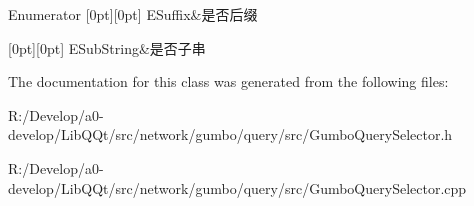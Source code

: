 \begin{DoxyEnumFields}{Enumerator}
[0pt][0pt]{}\mbox{\label{class_c_attribute_selector_ae0950894fd715af728d5a5c4621bf44da496c6a55d2ca0ea273def788f132b091}} 
E\+Suffix&是否后缀 \\
\hline

[0pt][0pt]{}\mbox{\label{class_c_attribute_selector_ae0950894fd715af728d5a5c4621bf44daa792f945d982ebb1e00ad7d62d21e48f}} 
E\+Sub\+String&是否子串 \\
\hline

\end{DoxyEnumFields}


The documentation for this class was generated from the following files\+:\begin{DoxyCompactItemize}
\item 
R\+:/\+Develop/a0-\/develop/\+Lib\+Q\+Qt/src/network/gumbo/query/src/Gumbo\+Query\+Selector.\+h\item 
R\+:/\+Develop/a0-\/develop/\+Lib\+Q\+Qt/src/network/gumbo/query/src/Gumbo\+Query\+Selector.\+cpp\end{DoxyCompactItemize}
